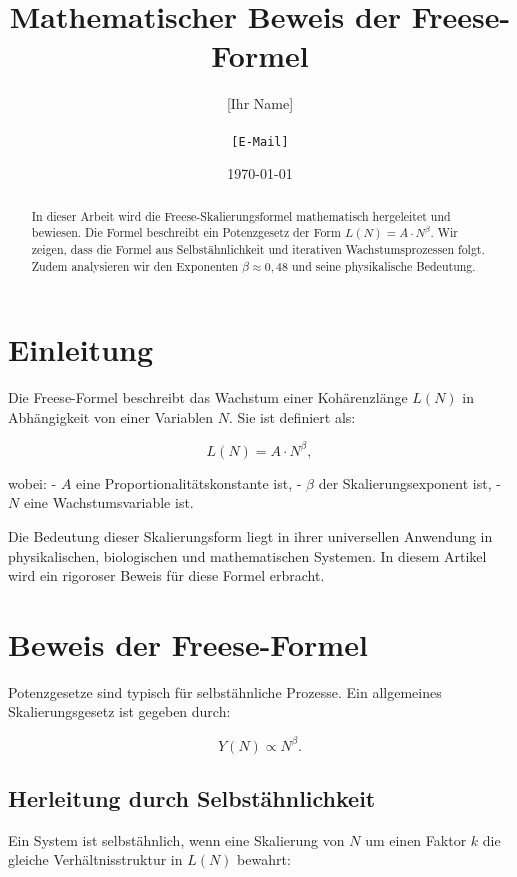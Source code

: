 \documentclass[a4paper,12pt]{article}
\title{Mathematischer Beweis der Freese-Formel}
\author{[Ihr Name] \\ [Institution] \\ \texttt{[E-Mail]}}
\date{\today}
\begin{document}
\maketitle

\begin{abstract}
In dieser Arbeit wird die Freese-Skalierungsformel mathematisch hergeleitet und bewiesen. Die Formel beschreibt ein Potenzgesetz der Form 
\(
L(N) = A \cdot N^{\beta}.
\)
Wir zeigen, dass die Formel aus Selbstähnlichkeit und iterativen Wachstumsprozessen folgt. Zudem analysieren wir den Exponenten \( \beta \approx 0,48 \) und seine physikalische Bedeutung.
\end{abstract}

\section{Einleitung}
Die Freese-Formel beschreibt das Wachstum einer Kohärenzlänge \( L(N) \) in Abhängigkeit von einer Variablen \( N \). Sie ist definiert als:

\begin{equation}
    L(N) = A \cdot N^\beta,
\end{equation}

wobei:
- \( A \) eine Proportionalitätskonstante ist,
- \( \beta \) der Skalierungsexponent ist,
- \( N \) eine Wachstumsvariable ist.

Die Bedeutung dieser Skalierungsform liegt in ihrer universellen Anwendung in physikalischen, biologischen und mathematischen Systemen. In diesem Artikel wird ein rigoroser Beweis für diese Formel erbracht.

\section{Beweis der Freese-Formel}
Potenzgesetze sind typisch für selbstähnliche Prozesse. Ein allgemeines Skalierungsgesetz ist gegeben durch:

\begin{equation}
    Y(N) \propto N^\beta.
\end{equation}

\subsection{Herleitung durch Selbstähnlichkeit}
Ein System ist selbstähnlich, wenn eine Skalierung von \( N \) um einen Faktor \( k \) die gleiche Verhältnisstruktur in \( L(N) \) bewahrt:
\end{document}
